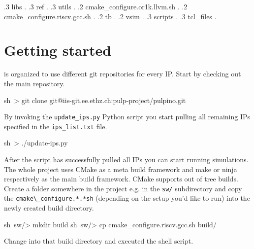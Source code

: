 \begin{flushleft}
{    .3 libs .
    .3 ref .
    .3 utils .
  .2 cmake\_configure.or1k.llvm.sh .
  .2 cmake\_configure.riscv.gcc.sh .
  .2 tb .
  .2 vsim .
    .3 scripts .
    .3 tcl\_files .
}
\end{flushleft}


\section{Getting started}

\pulpino is organized to use different git repositories for every IP. Start by checking out the main repository.

\begin{shellenv}
sh~> git clone git@iis-git.ee.ethz.ch:pulp-project/pulpino.git
\end{shellenv}

By invoking the \verb+update_ips.py+ Python script you start pulling all remaining IPs specified in the \verb+ips_list.txt+ file. 

\begin{shellenv}
sh~> ./update-ips.py
\end{shellenv}


After the script has successfully pulled all IPs you can start running simulations. The whole \pulpino project uses CMake as a meta build framework and make or ninja respectively as the main build framework. CMake supports out of tree builds. Create a folder somewhere in the project e.g. in the \verb+sw/+ subdirectory and copy the \verb+cmake\_configure.*.*sh+ (depending on the setup you'd like to run) into the newly created build directory.

\begin{shellenv}
sh~sw/> mkdir build
sh~sw/> cp cmake_configure.riscv.gcc.sh build/
\end{shellenv}

Change into that build directory and executed the shell script.

